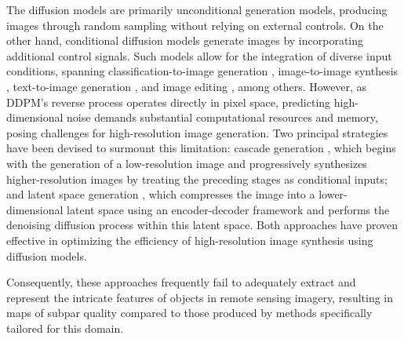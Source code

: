 The diffusion models are primarily unconditional generation models, producing images through random sampling without relying on external controls. On the other hand, conditional diffusion models generate images by incorporating additional control signals. Such models allow for the integration of diverse input conditions, spanning classification-to-image generation \cite{Ho2022CascadedDiffusionModels}, image-to-image synthesis \cite{Saharia2022PaletteImagetoImageDiffusion,Saharia2022ImageSuperResolutionIterative,Zhang2023AddingConditionalControl}, text-to-image generation \cite{Rombach2022HighResolutionImageSynthesis,Saharia2022PhotorealisticTexttoImageDiffusion,Wu2024TaiyiDiffusionXLAdvancingBilingual}, and image editing \cite{Avrahami2022BlendedDiffusionTextDriven,Nie2023BlessingRandomnessSDE,Shi2023DragDiffusionHarnessingDiffusion,Hertz2022PrompttoPromptImageEditing}, among others. However, as DDPM's reverse process operates directly in pixel space, predicting high-dimensional noise demands substantial computational resources and memory, posing challenges for high-resolution image generation. Two principal strategies have been devised to surmount this limitation: cascade generation \cite{Saharia2022PhotorealisticTexttoImageDiffusion,Ho2022CascadedDiffusionModels}, which begins with the generation of a low-resolution image and progressively synthesizes higher-resolution images by treating the preceding stages as conditional inputs; and latent space generation \cite{Rombach2022HighResolutionImageSynthesis}, which compresses the image into a lower-dimensional latent space using an encoder-decoder framework and performs the denoising diffusion process within this latent space. Both approaches have proven effective in optimizing the efficiency of high-resolution image synthesis using diffusion models.

Consequently, these approaches frequently fail to adequately extract and represent the intricate features of objects in remote sensing imagery, resulting in maps of subpar quality compared to those produced by methods specifically tailored for this domain.

